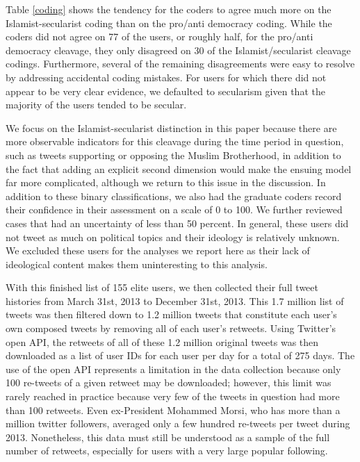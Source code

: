 \documentclass[12pt]{article}
\begin{document}
Table \ref{coding} shows the tendency for the coders to agree much more on the Islamist-secularist coding than on the pro/anti democracy coding. While the coders did not agree on 77 of the users, or roughly half, for the pro/anti democracy cleavage, they only disagreed on 30 of the Islamist/secularist cleavage codings. Furthermore, several of the remaining disagreements were easy to resolve by addressing accidental coding mistakes. For users for which there did not appear to be very clear evidence, we defaulted to secularism given that the majority of the users tended to be secular.

We focus on the Islamist-secularist distinction in this paper because there are more observable indicators for this cleavage during the time period in question, such as tweets supporting or opposing the Muslim Brotherhood, in addition to the fact that adding an explicit second dimension would make the ensuing model far more complicated, although we return to this issue in the discussion. In addition to these binary classifications, we also had the graduate coders record their confidence in their assessment on a scale of 0 to 100. We further reviewed cases that had an uncertainty of less than 50 percent. In general, these users did not tweet as much on political topics and their ideology is relatively unknown. We excluded these users for the analyses we report here as their lack of ideological content makes them uninteresting to this analysis.

With this finished list of 155 elite users, we then collected their full tweet histories from March 31st, 2013 to December 31st, 2013. This 1.7 million list of tweets was then filtered down to 1.2 million tweets that constitute each user's own composed tweets by removing all of each user's retweets. Using Twitter's open API, the retweets of all of these 1.2 million original tweets was then downloaded as a list of user IDs for each user per day for a total of 275 days. The use of the open API represents a limitation in the data collection because only 100 re-tweets of a given retweet may be downloaded; however, this limit was rarely reached in practice because very few of the tweets in question had more than 100 retweets. Even ex-President Mohammed Morsi, who has more than a million twitter followers, averaged only a few hundred re-tweets per tweet during 2013. Nonetheless, this data must still be understood as a sample of the full number of retweets, especially for users with a very large popular following.
\end{document}
